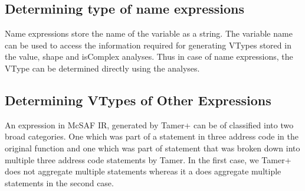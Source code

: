 \subsection{Determining type of name expressions}
Name expressions store the name of the variable as a string. The variable name can be used to access the information required for generating VTypes stored in the value, shape and isComplex analyses. Thus in case of name expressions, the VType can be determined directly using the analyses. 

\subsection{Determining VTypes of Other Expressions}
An expression in McSAF IR, generated by Tamer+ can be of classified into two broad categories. One which was part of a statement in three address code in the original \matlab function and one which was part of statement that was broken down into multiple three address code statements by Tamer. In the first case, we Tamer+ does not aggregate multiple statements whereas it a does aggregate multiple statements in the second case.  

